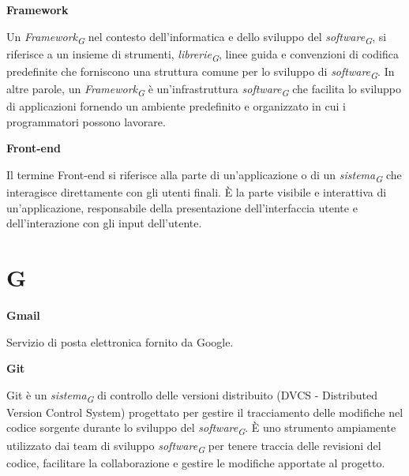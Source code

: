 \documentclass{article}
\begin{document}
\vspace{0.4cm}

\textbf{Framework}

\vspace{0.1cm}

Un \textit{Framework}\textsubscript{\textit{G}} nel contesto dell'informatica e dello sviluppo del \textit{software}\textsubscript{\textit{G}}, si riferisce a un insieme di strumenti, \textit{librerie}\textsubscript{\textit{G}}, linee guida e convenzioni di codifica predefinite che forniscono una struttura comune per lo sviluppo di \textit{software}\textsubscript{\textit{G}}. In altre parole, un \textit{Framework}\textsubscript{\textit{G}} è un'infrastruttura \textit{software}\textsubscript{\textit{G}} che facilita lo sviluppo di applicazioni fornendo un ambiente predefinito e organizzato in cui i programmatori possono lavorare.

\vspace{0.4cm}

\textbf{Front-end}

\vspace{0.1cm}

Il termine Front-end si riferisce alla parte di un'applicazione o di un \textit{sistema}\textsubscript{\textit{G}} che interagisce direttamente con gli utenti finali. È la parte visibile e interattiva di un'applicazione, responsabile della presentazione dell'interfaccia utente e dell'interazione con gli input dell'utente.

\pagebreak
\section*{G}
{}

\vspace{0.4cm}

\textbf{Gmail}

\vspace{0.1cm}

Servizio di posta elettronica fornito da Google.

\vspace{0.4cm}

\textbf{Git}

\vspace{0.1cm}

Git è un \textit{sistema}\textsubscript{\textit{G}} di controllo delle versioni distribuito (DVCS - Distributed Version Control System) progettato per gestire il tracciamento delle modifiche nel codice sorgente durante lo sviluppo del \textit{software}\textsubscript{\textit{G}}. È uno strumento ampiamente utilizzato dai team di sviluppo \textit{software}\textsubscript{\textit{G}} per tenere traccia delle revisioni del codice, facilitare la collaborazione e gestire le modifiche apportate al progetto.
\end{document}
